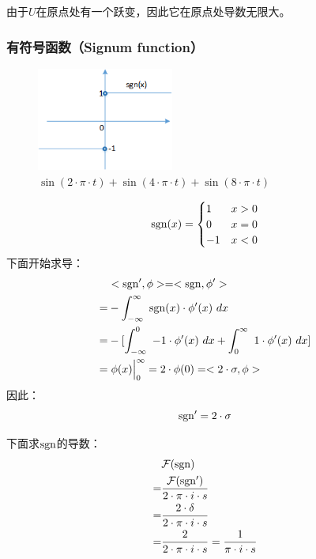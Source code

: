 由于$U$在原点处有一个跃变，因此它在原点处导数无限大。
\subsubsection {有符号函数（Signum function）}
\begin{figure}[H]
	\centering
	\includegraphics[width=0.4\textwidth]{assets/sgn_function.png}
	\caption{$\sin(2\cdot\pi\cdot t)+\sin(4\cdot\pi\cdot t)+\sin(8\cdot\pi\cdot t)$}
\end{figure}
\begin{align*}
	\operatorname{sgn}(x)=
	\begin{cases}
		1  & x>0 \\
		0  & x=0 \\
		-1 & x<0 \\
	\end{cases}
\end{align*}
下面开始求导：
\begin{align*}
	  & <\sgn',\phi>=<\sgn,\phi'>                                                          \\
	= & -\int_{-\infty}^{\infty}\ \sgn(x)\cdot \phi'(x)\ dx                                \\
	= & -[\int_{-\infty}^{0}\ -1\cdot \phi'(x)\ dx+\int_{0}^{\infty}\ 1\cdot \phi'(x)\ dx] \\
	= & \rsx{\phi(x)}_0^\infty=2\cdot \phi(0)=<2\cdot \sigma,\phi>
\end{align*}
因此：
\begin{equation}
	\operatorname{sgn}'=2\cdot \sigma
\end{equation}

下面求$\operatorname{sgn}$的导数：
\begin{align*}
	  & \mathcal{F}(\operatorname{sgn})                                             \\
	= & \frac{\mathcal{F}(\operatorname{sgn}')}{2\cdot\pi\cdot i\cdot s}            \\
	= & \frac{2\cdot \delta}{2\cdot\pi\cdot i\cdot s}                 \\
	= & \frac{2}{2\cdot\pi\cdot i\cdot s}=\frac{1}{\pi\cdot i\cdot s} \\
\end{align*}

